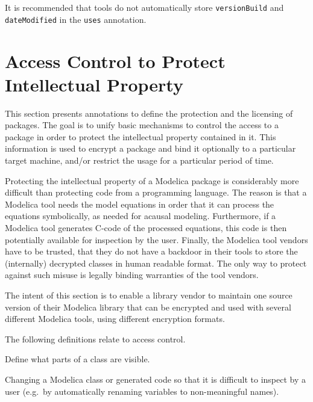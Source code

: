 \begin{nonnormative}
It is recommended that tools do not automatically store \lstinline!versionBuild! and \lstinline!dateModified! in the \lstinline!uses! annotation.
\end{nonnormative}

\section{Access Control to Protect Intellectual Property}\label{annotations-for-access-control-to-protect-intellectual-property}\label{access-control-to-protect-intellectual-property}

This section presents annotations to define the protection and the
licensing of packages. The goal is to unify basic mechanisms to control
the access to a package in order to protect the intellectual property
contained in it. This information is used to encrypt a package and bind
it optionally to a particular target machine, and/or restrict the usage
for a particular period of time.

\begin{nonnormative}
Protecting the intellectual property of a Modelica package is
considerably more difficult than protecting code from a programming
language. The reason is that a Modelica tool needs the model equations
in order that it can process the equations symbolically, as needed for
acausal modeling. Furthermore, if a Modelica tool generates C-code of
the processed equations, this code is then potentially available for
inspection by the user. Finally, the Modelica tool vendors have to be
trusted, that they do not have a backdoor in their tools to store the
(internally) decrypted classes in human readable format. The only way to
protect against such misuse is legally binding warranties of the tool
vendors.

The intent of this section is to enable a library vendor to
maintain one source version of their Modelica library that can be
encrypted and used with several different Modelica tools, using
different encryption formats.
\end{nonnormative}

The following definitions relate to access control.

\begin{definition}[Protection]
Define what parts of a class are visible.
\end{definition}

\begin{definition}[Obfuscation]
Changing a Modelica class or generated code so that it is difficult to inspect by a user (e.g.\ by automatically renaming variables to non-meaningful names).
\end{definition}

